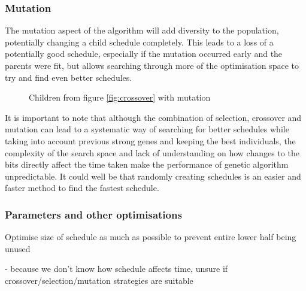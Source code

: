 \documentclass{article}
\def\listset{\pgfqkeys{/List}}
\begin{document}
\subsubsection{Mutation}
The mutation aspect of the algorithm will add diversity to the population, potentially changing a child schedule completely. This leads to a loss of a potentially good schedule, especially if the mutation occurred early and the parents were fit, but allows searching through more of the optimisation space to try and find even better schedules.
\begin{figure}[H]
\centering
{}
\caption{Children from figure \ref{fig:crossover} with mutation}
\label{fig:mutation}
\end{figure}
\noindent It is important to note that although the combination of selection, crossover and mutation can lead to a systematic way of searching for better schedules while taking into account previous strong genes and keeping the best individuals, the complexity of the search space and lack of understanding on how changes to the bits directly affect the time taken make the performance of genetic algorithm unpredictable. It could well be that randomly creating schedules is an easier and faster method to find the fastest schedule. 

\subsubsection{Parameters and other optimisations}

Optimise size of schedule as much as possible to prevent entire lower half being unused

- because we don't know how schedule affects time, unsure if crossover/selection/mutation strategies are suitable
\end{document}
